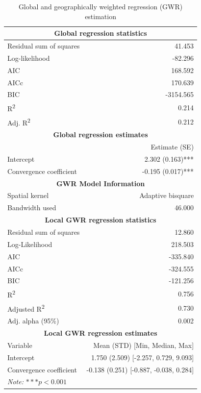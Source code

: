 \documentclass[smallextended, natbib]{svjour3}       %
\begin{document}
\begin{table}[ht]
\centering
\caption{Global and geographically weighted regression (GWR) estimation}
\label{tab:gwr}
\small
\begin{tabular}{lr}
\hline
\multicolumn{2}{c}{\textbf{Global regression statistics}} \\
\hline
Residual sum of squares & 41.453 \\
Log-likelihood & -82.296 \\
AIC & 168.592 \\
AICc & 170.639 \\
BIC & -3154.565 \\
R\textsuperscript{2} & 0.214 \\
Adj. R\textsuperscript{2} & 0.212 \\
\hline
\multicolumn{2}{c}{\textbf{Global regression estimates}} \\
\hline
 & Estimate (SE) \\
Intercept & 2.302 (0.163)*** \\
Convergence coefficient  & -0.195 (0.017)*** \\
\hline
\multicolumn{2}{c}{\textbf{GWR Model Information}} \\
\hline
Spatial kernel & Adaptive bisquare \\
Bandwidth used & 46.000 \\
\hline
\multicolumn{2}{c}{\textbf{Local GWR regression statistics}} \\
\hline
Residual sum of squares & 12.860 \\
Log-Likelihood & 218.503 \\
AIC & -335.840 \\
AICc & -324.555 \\
BIC & -121.256 \\
R\textsuperscript{2} & 0.756 \\
Adjusted R\textsuperscript{2} & 0.730 \\
Adj. alpha (95\%) & 0.002 \\
\hline
\multicolumn{2}{c}{\textbf{Local GWR regression estimates}} \\
\hline
Variable & Mean (STD) [Min, Median, Max] \\
\hline
Intercept & 1.750 (2.509) [-2.257, 0.729, 9.093] \\
Convergence coefficient & -0.138 (0.251) [-0.887, -0.038, 0.284] \\
\hline
\multicolumn{2}{l}{\textit{Note:} $***p<0.001$} \\
\end{tabular}
\end{table}
\end{document}
